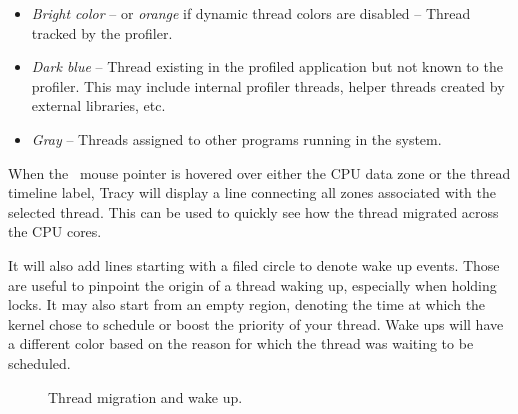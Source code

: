 \documentclass[hidelinks,titlepage,a4paper,twoside]{article}
\begin{document}
\begin{itemize}
\item \emph{Bright color} -- or \emph{orange} if dynamic thread colors are disabled -- Thread tracked by the profiler.
\item \emph{Dark blue} -- Thread existing in the profiled application but not known to the profiler. This may include internal profiler threads, helper threads created by external libraries, etc.
\item \emph{Gray} -- Threads assigned to other programs running in the system.
\end{itemize}

When the \faArrowPointer{}~mouse pointer is hovered over either the CPU data zone or the thread timeline label, Tracy will display a line connecting all zones associated with the selected thread. This can be used to quickly see how the thread migrated across the CPU cores. 

It will also add lines starting with a filed circle to denote wake up events. Those are useful to pinpoint the origin of a thread waking up, especially when holding locks. It may also start from an empty region, denoting the time at which the kernel chose to schedule or boost the priority of your thread. Wake ups will have a different color based on the reason for which the thread was waiting to be scheduled.

\begin{figure}[h]
	\centering{}
	\caption{Thread migration and wake up.}
	\label{threadmigration}
\end{figure}
\end{document}
